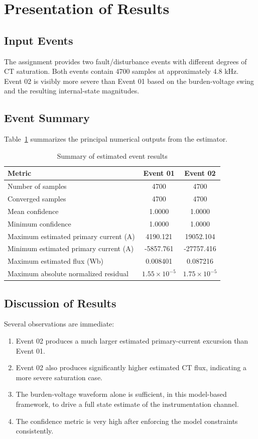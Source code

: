 \documentclass[11pt]{article}
\begin{document}
\section{Presentation of Results}
\subsection{Input Events}
The assignment provides two fault/disturbance events with different degrees of CT saturation. Both
events contain 4700 samples at approximately 4.8 kHz. Event 02 is visibly more severe than Event
01 based on the burden-voltage swing and the resulting internal-state magnitudes.

\subsection{Event Summary}
Table~\ref{tab:summary} summarizes the principal numerical outputs from the estimator.

\begin{table}[H]
  \centering
  \caption{Summary of estimated event results}
  \label{tab:summary}
  \begin{tabular}{>{\raggedright\arraybackslash}p{2.6in}cc}
    \toprule
    Metric & Event 01 & Event 02 \\
    \midrule
    Number of samples & 4700 & 4700 \\
    Converged samples & 4700 & 4700 \\
    Mean confidence & 1.0000 & 1.0000 \\
    Minimum confidence & 1.0000 & 1.0000 \\
    Maximum estimated primary current (A) & 4190.121 & 19052.104 \\
    Minimum estimated primary current (A) & -5857.761 & -27757.416 \\
    Maximum estimated flux (Wb) & 0.008401 & 0.087216 \\
    Maximum absolute normalized residual & $1.55 \times 10^{-5}$ & $1.75 \times 10^{-5}$ \\
    \bottomrule
  \end{tabular}
\end{table}

\subsection{Discussion of Results}
Several observations are immediate:
\begin{enumerate}
  \item Event 02 produces a much larger estimated primary-current excursion than Event 01.
  \item Event 02 also produces significantly higher estimated CT flux, indicating a more severe
  saturation case.
  \item The burden-voltage waveform alone is sufficient, in this model-based framework, to drive a
  full state estimate of the instrumentation channel.
  \item The confidence metric is very high after enforcing the model constraints consistently.
\end{enumerate}
\end{document}
